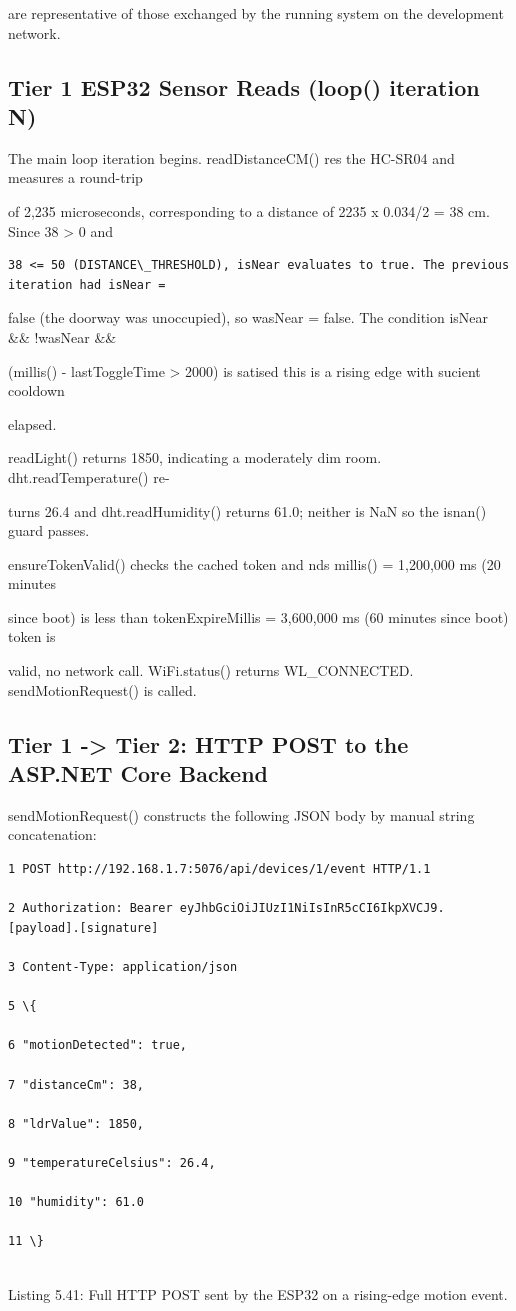are representative of those exchanged by the running system on the development network.


\subsection{Tier 1  ESP32 Sensor Reads (loop() iteration N)}
The main loop iteration begins. readDistanceCM() res the HC-SR04 and measures a round-trip

of 2,235 microseconds, corresponding to a distance of 2235 x 0.034/2 = 38 cm. Since 38 > 0 and

\begin{listingbox}
	\begin{verbatim}
38 <= 50 (DISTANCE\_THRESHOLD), isNear evaluates to true. The previous iteration had isNear =

\end{verbatim}
\end{listingbox}
false (the doorway was unoccupied), so wasNear = false. The condition isNear \&\& !wasNear \&\&

(millis() - lastToggleTime > 2000) is satised  this is a rising edge with sucient cooldown

elapsed.

readLight() returns 1850, indicating a moderately dim room. dht.readTemperature() re-

turns 26.4 and dht.readHumidity() returns 61.0; neither is NaN so the isnan() guard passes.

ensureTokenValid() checks the cached token and nds millis() = 1,200,000 ms (20 minutes

since boot) is less than tokenExpireMillis = 3,600,000 ms (60 minutes since boot)  token is

valid, no network call. WiFi.status() returns WL\_CONNECTED. sendMotionRequest() is called.


\subsection{Tier 1 -> Tier 2: HTTP POST to the ASP.NET Core Backend}
sendMotionRequest() constructs the following JSON body by manual string concatenation:

\begin{listingbox}
	\begin{verbatim}
1 POST http://192.168.1.7:5076/api/devices/1/event HTTP/1.1

2 Authorization: Bearer eyJhbGciOiJIUzI1NiIsInR5cCI6IkpXVCJ9.[payload].[signature]

3 Content-Type: application/json

5 \{

6 "motionDetected": true,

7 "distanceCm": 38,

8 "ldrValue": 1850,

9 "temperatureCelsius": 26.4,

10 "humidity": 61.0

11 \}


\end{verbatim}
\end{listingbox}
Listing 5.41: Full HTTP POST sent by the ESP32 on a rising-edge motion event.

